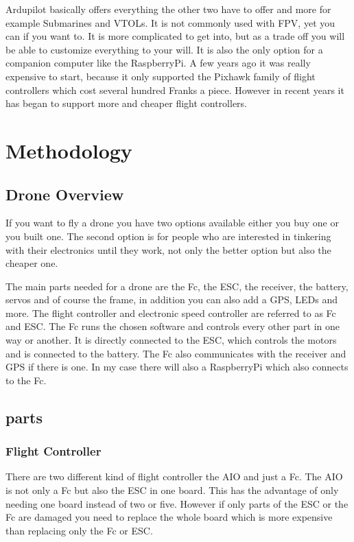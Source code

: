 \documentclass{article}
\begin{document}
	Ardupilot basically offers everything the other two have to offer and more for example Submarines and VTOLs. It is not commonly used with FPV, yet you can if you want to. It is more complicated to get into, but as a trade off you will be able to customize everything to your will. It is also the only option for a companion computer like the RaspberryPi. A few years ago it was really expensive to start, because it only supported the Pixhawk family of flight controllers which cost several hundred Franks a piece. However in recent years it has began to support more and cheaper flight controllers.
	
	\section{Methodology}
	\subsection{Drone Overview}
	If you want to fly a drone you have two options available either you buy one or you built one. The second option is for people who are interested in tinkering with their electronics until they work, not only the better option but also the cheaper one.
	
	The main parts needed for a drone are the \gls{Fc}, the \gls{ESC}, the receiver, the battery, servos and of course the frame, in addition you can also add a \gls{GPS}, LEDs and more. The flight controller and electronic speed controller are referred to as \gls{Fc} and ESC. The \gls{Fc} runs the chosen software and controls every other part in one way or another. It is directly connected to the \gls{ESC}, which controls the motors and is connected to the battery. The \gls{Fc} also communicates with the receiver and \gls{GPS} if there is one. In my case there will also a RaspberryPi which also connects to the \gls{Fc}.
	  
	\subsection{parts}
	
	\subsubsection[Fc]{Flight Controller}
	There are two different kind of flight controller the \gls{AIO} and just a \gls{Fc}. The \gls{AIO} is not only a \gls{Fc} but also the \gls{ESC} in one board. This has the advantage of only needing one board instead of two or five. However if only parts of the \gls{ESC} or the \gls{Fc} are damaged you need to replace the whole board which is more expensive than replacing only the \gls{Fc} or \gls{ESC}. 
	
\end{document}
